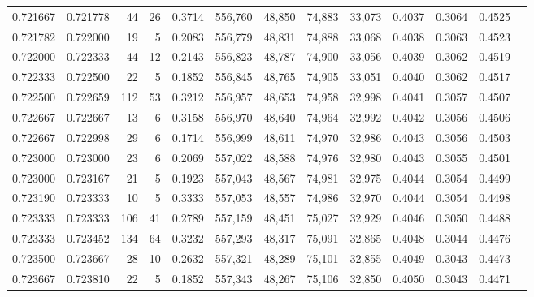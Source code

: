 \begin{tabular}{rrrrrrrrrrrrr}
0.721667 & 0.721778 &    44 &  26 &                                     0.3714 & 556,760 &  48,850 &  74,883 &  33,073 & 0.4037 & 0.3064 & 0.4525 \\
0.721782 & 0.722000 &    19 &   5 &                                     0.2083 & 556,779 &  48,831 &  74,888 &  33,068 & 0.4038 & 0.3063 & 0.4523 \\
0.722000 & 0.722333 &    44 &  12 &                                     0.2143 & 556,823 &  48,787 &  74,900 &  33,056 & 0.4039 & 0.3062 & 0.4519 \\
0.722333 & 0.722500 &    22 &   5 &                                     0.1852 & 556,845 &  48,765 &  74,905 &  33,051 & 0.4040 & 0.3062 & 0.4517 \\
0.722500 & 0.722659 &   112 &  53 &                                     0.3212 & 556,957 &  48,653 &  74,958 &  32,998 & 0.4041 & 0.3057 & 0.4507 \\
0.722667 & 0.722667 &    13 &   6 &                                     0.3158 & 556,970 &  48,640 &  74,964 &  32,992 & 0.4042 & 0.3056 & 0.4506 \\
0.722667 & 0.722998 &    29 &   6 &                                     0.1714 & 556,999 &  48,611 &  74,970 &  32,986 & 0.4043 & 0.3056 & 0.4503 \\
0.723000 & 0.723000 &    23 &   6 &                                     0.2069 & 557,022 &  48,588 &  74,976 &  32,980 & 0.4043 & 0.3055 & 0.4501 \\
0.723000 & 0.723167 &    21 &   5 &                                     0.1923 & 557,043 &  48,567 &  74,981 &  32,975 & 0.4044 & 0.3054 & 0.4499 \\
0.723190 & 0.723333 &    10 &   5 &                                     0.3333 & 557,053 &  48,557 &  74,986 &  32,970 & 0.4044 & 0.3054 & 0.4498 \\
0.723333 & 0.723333 &   106 &  41 &                                     0.2789 & 557,159 &  48,451 &  75,027 &  32,929 & 0.4046 & 0.3050 & 0.4488 \\
0.723333 & 0.723452 &   134 &  64 &                                     0.3232 & 557,293 &  48,317 &  75,091 &  32,865 & 0.4048 & 0.3044 & 0.4476 \\
0.723500 & 0.723667 &    28 &  10 &                                     0.2632 & 557,321 &  48,289 &  75,101 &  32,855 & 0.4049 & 0.3043 & 0.4473 \\
0.723667 & 0.723810 &    22 &   5 &                                     0.1852 & 557,343 &  48,267 &  75,106 &  32,850 & 0.4050 & 0.3043 & 0.4471 \\

\end{tabular}
